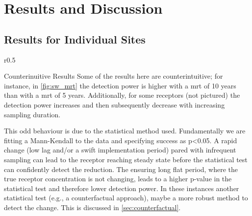 
\section[Results and Discussion]{Results and Discussion} \label{sec:results}

\subsection[Site Results]{Results for Individual Sites} \label{sec:site_results}


\begin{wrapfigure}{r}{0.5\textwidth}
    \begin{breakawaybox}[
        label={box:wierdresults}]{Counterinuitive Results}
        Some of the results here are counterintuitive; for instance, in \autoref{fig:sw_mrt} the detection power is higher with a \gls{mrt} of 10 years than with a \gls{mrt} of 5 years. Additionally, for some receptors (not pictured) the detection power increases and then subsequently decrease with increasing sampling duration.

        This odd behaviour is due to the statistical method used. Fundamentally we are fitting a Mann-Kendall to the data and specifying success as p<0.05. A rapid change (low lag and/or a swift implementation period) pared with infrequent sampling can lead to the receptor reaching steady state before the statistical test can confidently detect the reduction. The ensuring long flat period, where the true receptor concentration is not changing, leads to a higher p-value in the statistical test and therefore lower detection power. In these instances another statistical test (e.g., a counterfactual approach), maybe a more robust method to detect the change. This is discussed in \autoref{sec:counterfactual}.
    \end{breakawaybox}
\end{wrapfigure}

